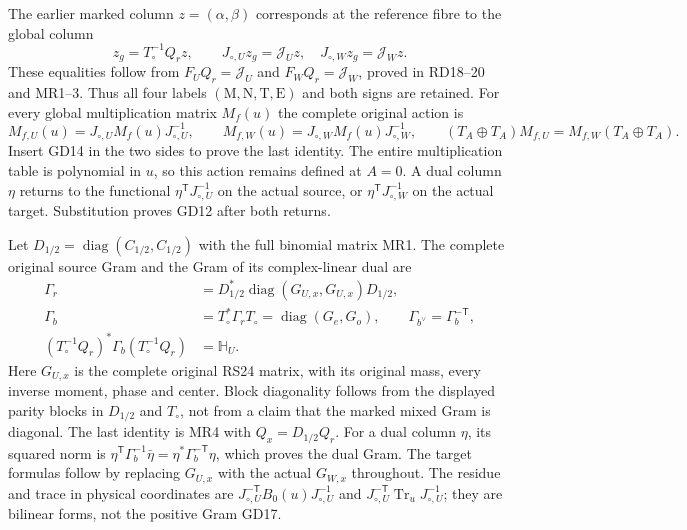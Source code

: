 \documentclass[11pt]{article}
\begin{document}
The earlier marked column $z=(\alpha,\beta)$ corresponds
at the reference fibre to the global column
\begin{equation}
 z_g=T_\circ^{-1}Q_rz,\qquad
 J_{\circ,U}z_g=\mathcal J_Uz,\quad
 J_{\circ,W}z_g=\mathcal J_Wz.
 \tag{GD15}
\end{equation}
These equalities follow from $F_UQ_r=\mathcal J_U$
and $F_WQ_r=\mathcal J_W$, proved in RD18--20 and
MR1--3. Thus all four labels $(\mathrm M,\mathrm N,
\mathrm T,\mathrm E)$ and both signs are retained.
For every global multiplication matrix $M_f(u)$ the
complete original action is
\begin{equation}
 M_{f,U}(u)=J_{\circ,U}M_f(u)J_{\circ,U}^{-1},\qquad
 M_{f,W}(u)=J_{\circ,W}M_f(u)J_{\circ,W}^{-1},\qquad
 (T_A\oplus T_A)M_{f,U}=M_{f,W}(T_A\oplus T_A).
 \tag{GD16}
\end{equation}
Insert GD14 in the two sides to prove the last identity.
The entire multiplication table is polynomial in $u$,
so this action remains defined at $A=0$. A dual column
$\eta$ returns to the functional
$\eta^{\mathsf T}J_{\circ,U}^{-1}$ on the actual source,
or $\eta^{\mathsf T}J_{\circ,W}^{-1}$ on the actual
target. Substitution proves GD12 after both returns.

Let $D_{1/2}=\operatorname{diag}(C_{1/2},C_{1/2})$ with
the full binomial matrix MR1. The complete original
source Gram and the Gram of its complex-linear dual are
\begin{equation}
\begin{aligned}
 \Gamma_r&=D_{1/2}^*\operatorname{diag}(G_{U,x},G_{U,x})D_{1/2},\\
 \Gamma_b&=T_\circ^*\Gamma_rT_\circ
                 =\operatorname{diag}(G_e,G_o),\qquad
 \Gamma_{b^\vee}=\Gamma_b^{-\mathsf T},\\
 (T_\circ^{-1}Q_r)^*\Gamma_b(T_\circ^{-1}Q_r)&=\mathbb H_U.
\end{aligned}\tag{GD17}
\end{equation}
Here $G_{U,x}$ is the complete original RS24 matrix,
with its original mass, every inverse moment, phase
and center. Block diagonality follows from the displayed
parity blocks in $D_{1/2}$ and $T_\circ$, not from a
claim that the marked mixed Gram is diagonal. The last
identity is MR4 with $Q_x=D_{1/2}Q_r$. For a dual column
$\eta$, its squared norm is
$\eta^{\mathsf T}\Gamma_b^{-1}\bar\eta
 =\eta^*\Gamma_b^{-\mathsf T}\eta$, which proves
the dual Gram. The target formulas follow by replacing
$G_{U,x}$ with the actual $G_{W,x}$ throughout.
The residue and trace in physical coordinates are
$J_{\circ,U}^{-\mathsf T}B_0(u)J_{\circ,U}^{-1}$ and
$J_{\circ,U}^{-\mathsf T}\operatorname{Tr}_uJ_{\circ,U}^{-1}$;
they are bilinear forms, not the positive Gram GD17.
\end{document}
